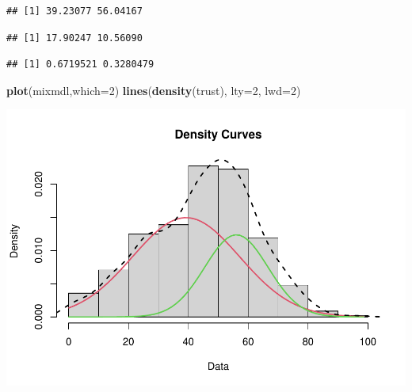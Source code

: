 \documentclass[
]{book}
\newenvironment{Shaded}{\begin{snugshade}}{\end{snugshade}}
\newcommand{\DataTypeTok}[1]{\textcolor[rgb]{0.13,0.29,0.53}{#1}}
\newcommand{\DecValTok}[1]{\textcolor[rgb]{0.00,0.00,0.81}{#1}}
\newcommand{\KeywordTok}[1]{\textcolor[rgb]{0.13,0.29,0.53}{\textbf{#1}}}
\newcommand{\NormalTok}[1]{#1}
\newcommand{\OperatorTok}[1]{\textcolor[rgb]{0.81,0.36,0.00}{\textbf{#1}}}
\begin{document}
\begin{verbatim}
## [1] 39.23077 56.04167
\end{verbatim}

\begin{Shaded}
\end{Shaded}

\begin{verbatim}
## [1] 17.90247 10.56090
\end{verbatim}

\begin{Shaded}
\end{Shaded}

\begin{verbatim}
## [1] 0.6719521 0.3280479
\end{verbatim}

\begin{Shaded}
\begin{Highlighting}[]
\KeywordTok{plot}\NormalTok{(mixmdl,}\DataTypeTok{which=}\DecValTok{2}\NormalTok{)}
\KeywordTok{lines}\NormalTok{(}\KeywordTok{density}\NormalTok{(trust), }\DataTypeTok{lty=}\DecValTok{2}\NormalTok{, }\DataTypeTok{lwd=}\DecValTok{2}\NormalTok{)}
\end{Highlighting}
\end{Shaded}

\includegraphics{bookdown-demo_files/figure-latex/307-2.pdf}
\end{document}
